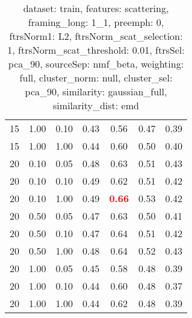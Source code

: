 \begin{table}
\begin{center}
\begin{tabular}{lllcccc}
15 & 1.00 & 0.10 & 0.43 & 0.56 & 0.47 & 0.39 \\ 
15 & 1.00 & 1.00 & 0.44 & 0.60 & 0.50 & 0.40 \\ 
20 & 0.10 & 0.05 & 0.48 & 0.63 & 0.51 & 0.43 \\ 
20 & 0.10 & 0.10 & 0.49 & 0.62 & 0.51 & 0.42 \\ 
20 & 0.10 & 1.00 & 0.49 & \textbf{\textcolor{red}{0.66}} & 0.53 & 0.42 \\ 
20 & 0.50 & 0.05 & 0.47 & 0.63 & 0.50 & 0.41 \\ 
20 & 0.50 & 0.10 & 0.47 & 0.64 & 0.51 & 0.42 \\ 
20 & 0.50 & 1.00 & 0.48 & 0.64 & 0.52 & 0.43 \\ 
20 & 1.00 & 0.05 & 0.45 & 0.58 & 0.48 & 0.39 \\ 
20 & 1.00 & 0.10 & 0.44 & 0.60 & 0.48 & 0.37 \\ 
20 & 1.00 & 1.00 & 0.44 & 0.62 & 0.48 & 0.39 \\ 
\end{tabular} 
\end{center} 
\caption{dataset: train, features: scattering, framing\_long: 1\_1, preemph: 0, ftrsNorm1: L2, ftrsNorm\_scat\_selection: 1, ftrsNorm\_scat\_threshold: 0.01, ftrsSel: pca\_90, sourceSep: nmf\_beta, weighting: full, cluster\_norm: null, cluster\_sel: pca\_90, similarity: gaussian\_full, similarity\_dist: emd} 
\label{datasetrFeaturscFraminlong1_1Preemp0Ftrsnorm1L2Ftrsnoscatselect1Ftrsnoscatthresh0.01Ftrsselpc90SourcesepnmbeWeightfuClustenormnuClusteselpc90SimilagafuSimiladistem} 
\end{table} 
 
